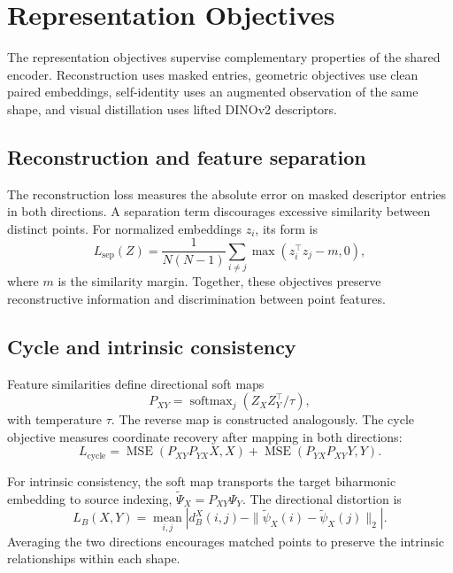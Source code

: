 \section{Representation Objectives}
\label{sec:objectives}
The representation objectives supervise complementary properties of the shared encoder. Reconstruction uses masked entries, geometric objectives use clean paired embeddings, self-identity uses an augmented observation of the same shape, and visual distillation uses lifted DINOv2 descriptors.

\subsection{Reconstruction and feature separation}
The reconstruction loss measures the absolute error on masked descriptor entries in both directions. A separation term discourages excessive similarity between distinct points. For normalized embeddings $z_i$, its form is
\begin{equation}
 L_{\mathrm{sep}}(Z)=\frac{1}{N(N-1)}\sum_{i\ne j}
 \max(z_i^\top z_j-m,0),
\end{equation}
where $m$ is the similarity margin. Together, these objectives preserve reconstructive information and discrimination between point features.

\subsection{Cycle and intrinsic consistency}
Feature similarities define directional soft maps
\begin{equation}
 P_{XY}=\operatorname{softmax}_{j}(Z_XZ_Y^\top/\tau),
\end{equation}
with temperature $\tau$. The reverse map is constructed analogously. The cycle objective measures coordinate recovery after mapping in both directions:
\begin{equation}
 L_{\mathrm{cycle}}=\operatorname{MSE}(P_{XY}P_{YX}X,X)
 +\operatorname{MSE}(P_{YX}P_{XY}Y,Y).
\end{equation}

For intrinsic consistency, the soft map transports the target biharmonic embedding to source indexing, $\widetilde\Psi_X=P_{XY}\Psi_Y$. The directional distortion is
\begin{equation}
 L_B(X,Y)=\underset{i,j}{\operatorname{mean}}
 \left|d_B^X(i,j)-\|\widetilde\psi_X(i)-\widetilde\psi_X(j)\|_2\right|.
\end{equation}
Averaging the two directions encourages matched points to preserve the intrinsic relationships within each shape.

